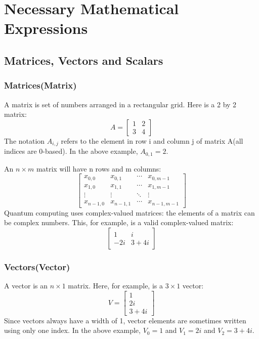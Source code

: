 \documentclass{article}
\begin{document}
\section{Necessary Mathematical Expressions}

\subsection{Matrices, Vectors and Scalars}
\subsubsection{Matrices(Matrix)}
A matrix is set of numbers arranged in a rectangular grid. Here is a 2 by 2 matrix:
\begin{equation*}
    A = \begin{bmatrix} 1 & 2 \\ 3 & 4 \end{bmatrix}
\end{equation*}
The notation $A_{i,j}$ refers to the element in row i and column j of matrix A(all indices are 0-based). In the above example, $A_{0,1} = 2$.

An $n \times m$ matrix will have n rows and m columns:
\begin{equation*}
    \begin{bmatrix}
    x_{0,0} & x_{0,1} & \dotsb & x_{0,m-1} \\
    x_{1,0} & x_{1,1} & \dotsb & x_{1,m-1} \\
    \vdots  & \vdots  & \ddots & \vdots  \\
    x_{n-1,0} & x_{n-1,1} & \dotsb & x_{n-1,m-1}
\end{bmatrix}
\end{equation*}
Quantum computing uses complex-valued matrices: the elements of a matrix can be complex numbers. This, for example, is a valid complex-valued matrix:
\begin{equation*}
    \begin{bmatrix}
    1 & i \\
    -2i & 3 + 4i
\end{bmatrix}
\end{equation*}

\subsubsection{Vectors(Vector)}
A vector is an $n \times 1$ matrix. Here, for example, is a $3 \times 1$ vector:
\begin{equation*}
    V = \begin{bmatrix} 1 \\ 2i \\ 3 + 4i \end{bmatrix}
\end{equation*}
Since vectors always have a width of 1, vector elements are sometimes written using only one index. In the above example, $V_0 = 1$ and $V_1 = 2i$ and $V_2 = 3 + 4i$.
\end{document}
